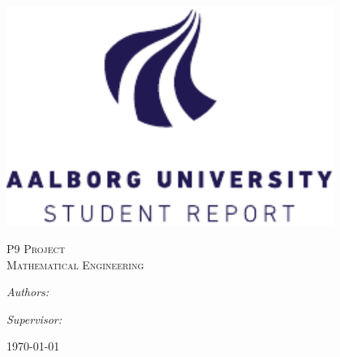
\begin{titlepage}
  \centering

  \vspace{2cm}

  {\huge\bfseries\projecttitle}
  
  
    
  \vspace{2cm}

  \includegraphics[width =0.8\textwidth]{incl/main/aau-report-badge.pdf}
  \vspace{1cm}
  
  \textsc{\LARGE P9 Project}\\
  \textsc{\Large Mathematical Engineering}


  \vspace{3cm}


  \begin{minipage}[t]{0.4\textwidth}
    \begin{flushleft}
      \large
      \emph{Authors:}\\
      \projectauthors
    \end{flushleft}
  \end{minipage}
  \begin{minipage}[t]{0.4\textwidth}
    \begin{flushright}
      \large
      \emph{Supervisor:}\\
      \projectsupervisors
    \end{flushright}
  \end{minipage}

  \vfill

  {\large\today}
\end{titlepage}